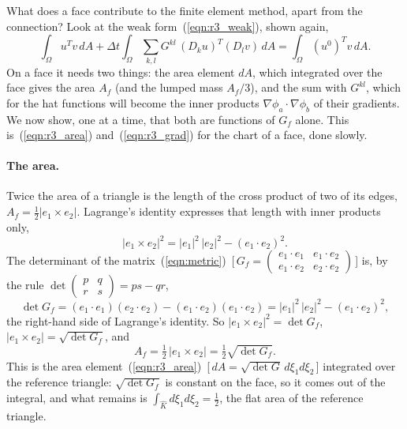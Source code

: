 What does a face contribute to the finite element method, apart from the connection? Look at the weak form~(\ref{eqn:r3_weak}), shown again,
\begin{equation*}
\int_\Omega u^Tv\, dA + \Delta t\int_\Omega \sum_{k,l} G^{kl}\,(D_ku)^T(D_lv)\, dA = \int_\Omega (u^0)^Tv\, dA .
\end{equation*}
On a face it needs two things: the area element $dA$, which integrated over the face gives the area $A_f$ (and the lumped mass $A_f/3$), and the sum with $G^{kl}$, which for the hat functions will become the inner products $\nabla\phi_a \cdot \nabla\phi_b$ of their gradients. We now show, one at a time, that both are functions of $G_f$ alone. This is~(\ref{eqn:r3_area}) and~(\ref{eqn:r3_grad}) for the chart of a face, done slowly.

\paragraph{The area.} Twice the area of a triangle is the length of the cross product of two of its edges, $A_f = \frac12 |e_1 \times e_2|$. Lagrange's identity expresses that length with inner products only,
\begin{equation*}
|e_1 \times e_2|^2 = |e_1|^2\, |e_2|^2 - (e_1 \cdot e_2)^2 .
\end{equation*}
The determinant of the matrix~(\ref{eqn:metric})~[\,$G_f = \left(\begin{smallmatrix} e_1\cdot e_1 & e_1\cdot e_2 \\ e_1\cdot e_2 & e_2\cdot e_2\end{smallmatrix}\right)$\,] is, by the rule $\det\left(\begin{smallmatrix} p & q \\ r & s\end{smallmatrix}\right) = ps - qr$,
\begin{equation*}
\det G_f = (e_1\cdot e_1)(e_2\cdot e_2) - (e_1\cdot e_2)(e_1\cdot e_2) = |e_1|^2\, |e_2|^2 - (e_1 \cdot e_2)^2 ,
\end{equation*}
the right-hand side of Lagrange's identity. So $|e_1\times e_2|^2 = \det G_f$, $|e_1 \times e_2| = \sqrt{\det G_f}$, and
\begin{equation*}
A_f = \tfrac12\, |e_1 \times e_2| = \tfrac12 \sqrt{\det G_f} .
\end{equation*}
This is the area element~(\ref{eqn:r3_area})~[\,$dA = \sqrt{\det G}\,d\xi_1 d\xi_2$\,] integrated over the reference triangle: $\sqrt{\det G_f}$ is constant on the face, so it comes out of the integral, and what remains is $\int_{\hat K} d\xi_1 d\xi_2 = \frac12$, the flat area of the reference triangle.

